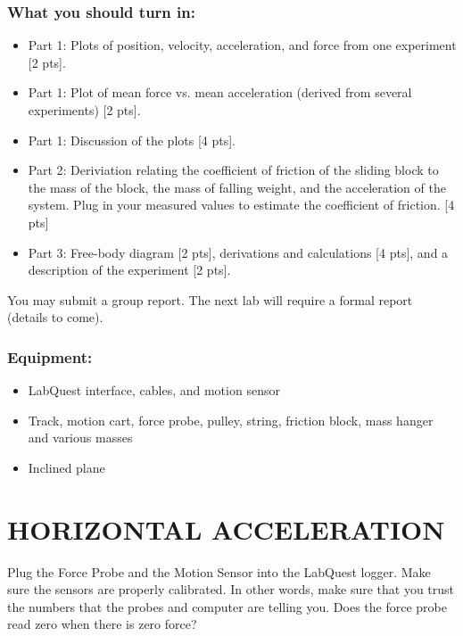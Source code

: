 \documentclass[11pt,letterpaper]{article}
\begin{document}
\subsubsection*{What you should turn in:}
\begin{itemize}
\setlength{\parskip}{3pt}
\item Part 1: Plots of position, velocity, acceleration, and force from one experiment [2 pts].
\item Part 1: Plot of mean force vs. mean acceleration (derived from several experiments) [2 pts].
\item Part 1: Discussion of the plots [4 pts].
\item Part 2: Deriviation relating the coefficient of friction of the sliding block to the mass of the block, the mass of falling weight, and the acceleration of the system. Plug in your measured values to estimate the coefficient of friction. [4 pts]
\item Part 3: Free-body diagram [2 pts], derivations and calculations [4 pts], and a description of the experiment [2 pts].
\end{itemize}
You may submit a group report. The next lab will require a formal report (details to come). 

\subsubsection*{Equipment:}
\begin{itemize}
\setlength{\parskip}{3pt}
\item LabQuest interface, cables, and motion sensor
\item Track, motion cart, force probe, pulley, string, friction block, mass hanger and various masses
\item Inclined plane
\end{itemize}



\section{HORIZONTAL ACCELERATION} 
Plug the Force Probe and the Motion Sensor into the LabQuest logger. Make sure the sensors are properly calibrated. In other words, make sure that you trust the numbers that the probes and computer are telling you. Does the force probe read zero when there is zero force?
\end{document}
